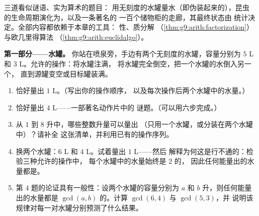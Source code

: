 \begin{problem}
\label{pb:g9:arith:1}
三道看似谜语、实为算术的题目：
用无刻度的水罐量水（即伪装起来的），昆虫
的生命周期演化为，以及一条著名的
一百个储物柜的走廊，其最终状态由
统计决定。全部内容都依赖于本章的工具：
性、质分解
（\cref{thm:g9:arith:factorization}）与欧几里得算法
（\cref{thm:g9:arith:euclidalgo}）。

\medskip
\noindent\textbf{第一部分——水罐。}
你站在喷泉旁，手边有两个无刻度的水罐，容量分别为 $5$ L 和
$3$ L。允许的操作：将水罐注满，
将水罐完全倒空，把一个水罐的水倒入另一个，
直到源罐变空或目标罐装满。
\begin{enumerate}
  \item 恰好量出 $1$ L。（写出你的操作顺序，
        以及每次操作后两个水罐中的水量。）
  \item 恰好量出 $4$ L——一部著名动作片中的
        谜题。（可以用六步完成。）
  \item 从 $1$ 到 $8$ 升中，哪些整数升量可以量出
        （只用一个水罐，或分装在两个水罐中）？请补全
        这张清单，并利用已有的操作序列。
  \item 换两个水罐：$6$ L 和 $4$ L。试着量出 $1$ L——然后
        解释为何这是行不通的：检验三种允许的操作中，
        每个水罐中的水量始终是 $2$ 的，
        因此任何能量出的水量都是。
  \item 第 4 题的论证具有一般性：设两个水罐的容量分别为 $a$
        和 $b$ 升，则任何能量出的水量都是
        $\gcd(a, b)$ 的。计算 $\gcd(6, 4)$ 与 $\gcd(5, 3)$，并
        说明该规律对每一对水罐分别预测了什么结果。
\end{enumerate}


\end{problem}
